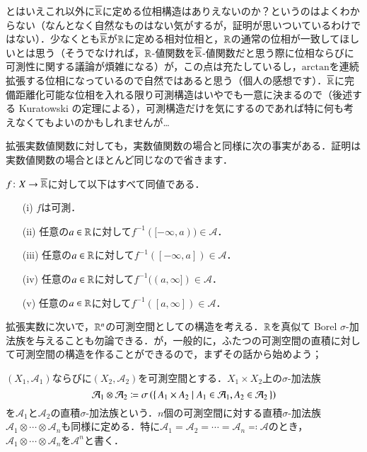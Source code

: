 \begin{que}[**]
とはいえこれ以外に$\overline{\mathbb{R}}$に定める位相構造はありえないのか？というのはよくわからない（なんとなく自然なものはない気がするが，証明が思いついているわけではない）．少なくとも$\overline{\mathbb{R}}$が$\mathbb{R}$に定める相対位相と，$\mathbb{R}$の通常の位相が一致してほしいとは思う（そうでなければ，$\mathbb{R}$-値関数を$\overline{\mathbb{R}}$-値関数だと思う際に位相ならびに可測性に関する議論が煩雑になる）が，この点は充たしているし，$\mathrm{arctan}$を連続拡張する位相になっているので自然ではあると思う（個人の感想です）．$\overline{\mathbb{R}}$に完備距離化可能な位相を入れる限り可測構造はいやでも一意に決まるので（後述する Kuratowski の定理による），可測構造だけを気にするのであれば特に何も考えなくてもよいのかもしれませんが…
\end{que}

拡張実数値関数に対しても，実数値関数の場合と同様に次の事実がある．証明は実数値関数の場合とほとんど同じなので省きます．

\begin{que}
$f \colon X \to \overline{\mathbb{R}}$に対して以下はすべて同値である．
\begin{enumerate}
\item[(i)] $f$は可測．
\item[(ii)] 任意の$a \in \mathbb{R}$に対して$f^{-1}([-\infty,a)) \in \mathcal{A}$．
\item[(iii)] 任意の$a \in \mathbb{R}$に対して$f^{-1}([-\infty,a]) \in \mathcal{A}$．
\item[(iv)] 任意の$a \in \mathbb{R}$に対して$f^{-1}((a,\infty]) \in \mathcal{A}$．
\item[(v)] 任意の$a \in \mathbb{R}$に対して$f^{-1}([a,\infty]) \in \mathcal{A}$．
\end{enumerate}
\end{que}

拡張実数に次いで，$\mathbb{R}^n$の可測空間としての構造を考える．$\mathbb{R}$を真似て Borel $\sigma$-加法族を与えることも勿論できる．が，一般的に，ふたつの可測空間の直積に対して可測空間の構造を作ることができるので，まずその話から始めよう；

\begin{defi}
$(X_1, \mathcal{A}_1)$ならびに$(X_2, \mathcal{A}_2)$を可測空間とする．$X_1 \times X_2$上の$\sigma$-加法族
\begin{equation}
\mathcal{A}_1 \otimes \mathcal{A}_2 \coloneqq \sigma\left( \set{A_1 \times A_2 | A_1 \in \mathcal{A}_1, A_2 \in \mathcal{A}_2} \right)
\end{equation}を$\mathcal{A}_1$と$\mathcal{A}_2$の直積$\sigma$-加法族という．$n$個の可測空間に対する直積$\sigma$-加法族$\mathcal{A}_1 \otimes \cdots \otimes \mathcal{A}_n$も同様に定める．特に$\mathcal{A}_1 = \mathcal{A}_2 = \cdots = \mathcal{A}_n \eqqcolon \mathcal{A}$のとき，$\mathcal{A}_1 \otimes \cdots \otimes \mathcal{A}_n$を$\mathcal{A}^{n}$と書く．
\end{defi}

